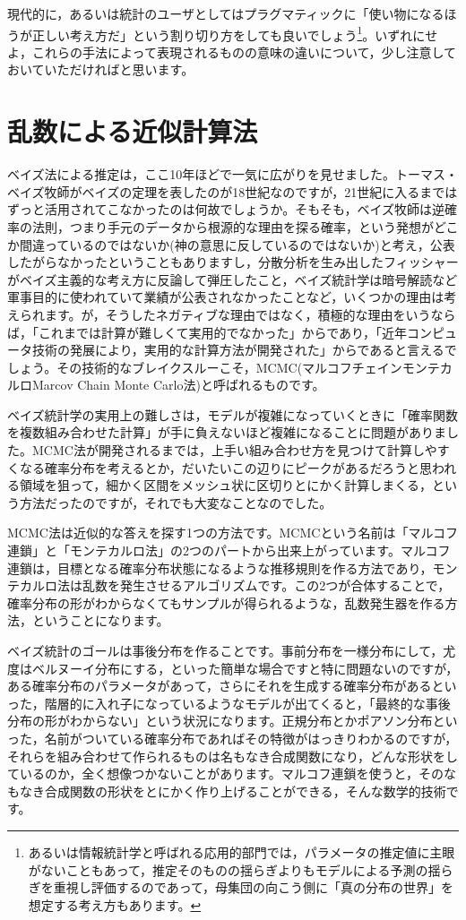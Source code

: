 \documentclass{ltjsarticle}
\begin{document}
現代的に，あるいは統計のユーザとしてはプラグマティックに「使い物になるほうが正しい考え方だ」という割り切り方をしても良いでしょう\footnote{あるいは情報統計学と呼ばれる応用的部門では，パラメータの推定値に主眼がないこともあって，推定そのものの揺らぎよりもモデルによる予測の揺らぎを重視し評価するのであって，母集団の向こう側に「真の分布の世界」を想定する考え方もあります。}。いずれにせよ，これらの手法によって表現されるものの意味の違いについて，少し注意しておいていただければと思います。
\section{乱数による近似計算法}
ベイズ法による推定は，ここ10年ほどで一気に広がりを見せました。トーマス・ベイズ牧師がベイズの定理を表したのが18世紀なのですが，21世紀に入るまではずっと活用されてこなかったのは何故でしょうか。そもそも，ベイズ牧師は逆確率の法則，つまり手元のデータから根源的な理由を探る確率，という発想がどこか間違っているのではないか(神の意思に反しているのではないか)と考え，公表したがらなかったということもありますし，分散分析を生み出したフィッシャーがベイズ主義的な考え方に反論して弾圧したこと，ベイズ統計学は暗号解読など軍事目的に使われていて業績が公表されなかったことなど，いくつかの理由は考えられます。が，そうしたネガティブな理由ではなく，積極的な理由をいうならば，「これまでは計算が難しくて実用的でなかった」からであり，「近年コンピュータ技術の発展により，実用的な計算方法が開発された」からであると言えるでしょう。その技術的なブレイクスルーこそ，MCMC(マルコフチェインモンテカルロMarcov Chain Monte Carlo法)と呼ばれるものです。

ベイズ統計学の実用上の難しさは，モデルが複雑になっていくときに「確率関数を複数組み合わせた計算」が手に負えないほど複雑になることに問題がありました。MCMC法が開発されるまでは，上手い組み合わせ方を見つけて計算しやすくなる確率分布を考えるとか，だいたいこの辺りにピークがあるだろうと思われる領域を狙って，細かく区間をメッシュ状に区切りとにかく計算しまくる，という方法だったのですが，それでも大変なことなのでした。

MCMC法は近似的な答えを探す1つの方法です。MCMCという名前は「マルコフ連鎖」と「モンテカルロ法」の2つのパートから出来上がっています。マルコフ連鎖は，目標となる確率分布状態になるような推移規則を作る方法であり，モンテカルロ法は乱数を発生させるアルゴリズムです。この2つが合体することで，確率分布の形がわからなくてもサンプルが得られるような，乱数発生器を作る方法，ということになります。

ベイズ統計のゴールは事後分布を作ることです。事前分布を一様分布にして，尤度はベルヌーイ分布にする，といった簡単な場合ですと特に問題ないのですが，ある確率分布のパラメータがあって，さらにそれを生成する確率分布があるといった，階層的に入れ子になっているようなモデルが出てくると，「最終的な事後分布の形がわからない」という状況になります。正規分布とかポアソン分布といった，名前がついている確率分布であればその特徴がはっきりわかるのですが，それらを組み合わせて作られるものは名もなき合成関数になり，どんな形状をしているのか，全く想像つかないことがあります。マルコフ連鎖を使うと，そのなもなき合成関数の形状をとにかく作り上げることができる，そんな数学的技術です。
\end{document}
